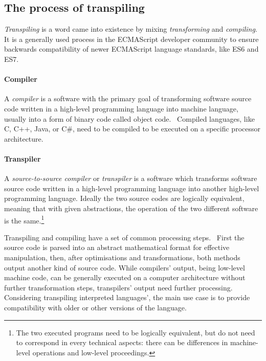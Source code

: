\subsection{The process of transpiling}

\emph{Transpiling} is a word came into existence by mixing \emph{transforming} and \emph{compiling}. It is a generally used process in the ECMAScript developer community to ensure backwards compatibility of newer ECMAScript language standards, like ES6 and ES7.

\paragraph{Compiler}

A \emph{compiler} is a software with the primary goal of transforming software source code written in a high-level programming language into machine language, usually into a form of binary code called object code.~\cite{pcmagcompilers} Compiled languages, like C, C++, Java, or C\#, need to be compiled to be executed on a specific processor architecture.

\paragraph{Transpiler}

A \emph{source-to-source compiler} or \emph{transpiler} is a software which transforms software source code written in a high-level programming language into another high-level programming language. Ideally the two source codes are logically equivalent, meaning that with given abstractions, the operation of the two different software is the same.\footnote{The two executed programs need to be logically equivalent, but do not need to correspond in every technical aspects: there can be differences in machine-level operations and low-level proceedings.}

Transpiling and compiling have a set of common processing steps.~\cite{kulkarnitranspiler} First the source code is parsed into an abstract mathematical format for effective manipulation, then, after optimisations and transformations, both methods output another kind of source code. While compilers' output, being low-level machine code, can be generally executed on a computer architecture without further transformation steps, transpilers' output need further processing. Considering transpiling interpreted languages', the main use case is to provide compatibility with older or other versions of the language.


